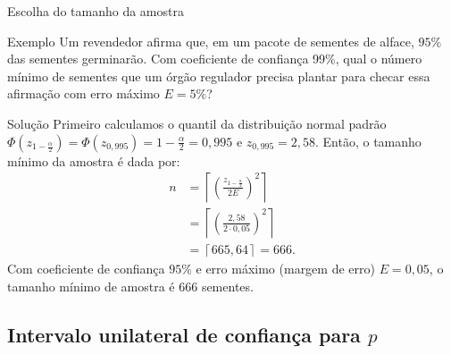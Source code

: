 \documentclass[8pt]{beamer}
\begin{document}
\begin{frame}{Escolha do tamanho da amostra}
	
\normalsize
	
	\begin{block}{Exemplo}
		Um revendedor afirma que, em um pacote de sementes de alface, $95\%$ das sementes germinarão. Com coeficiente de confiança 99\%, qual o número mínimo de sementes que um órgão regulador precisa plantar para checar essa afirmação com erro máximo $E=5\%$?
		
	\end{block}

	\begin{block}{Solução}
		Primeiro calculamos o quantil da distribuição normal padrão $\Phi\left( z_{1-\frac{\alpha}{2}} \right) = \Phi\left( z_{0,995} \right) = 1 - \frac{\alpha}{2} = 0,995$ 	e $z_{0,995} = 2,58$. Então, o tamanho mínimo da amostra é dada por:
		\begin{align*}
			n &= \left\lceil \left( \frac{z_{1-\frac{\alpha}{2}}}{2 E} \right)^2 \right\rceil\\
			&= \left\lceil \left( \frac{2,58}{2 \cdot 0,05} \right)^2 \right\rceil\\
			&= \left\lceil 665,64 \right\rceil = 666.
		\end{align*}	
		Com coeficiente de confiança $95\%$ e erro máximo (margem de erro) $E=0,05$, o tamanho mínimo de amostra é $666$ sementes.
	\end{block}

\normalsize

\end{frame}

\subsection{Intervalo unilateral de confiança para $p$}
\end{document}
